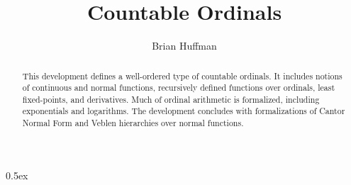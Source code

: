 \documentclass[11pt,a4paper]{article}
\begin{document}
\title{Countable Ordinals}
\author{Brian Huffman}
\maketitle
\begin{abstract}
This development defines a well-ordered type of countable ordinals.
It includes notions of continuous and normal functions, recursively
defined functions over ordinals, least fixed-points, and derivatives.
Much of ordinal arithmetic is formalized, including exponentials and
logarithms. The development concludes with formalizations of Cantor
Normal Form and Veblen hierarchies over normal functions.
\end{abstract}

\tableofcontents


\newpage

\parindent 0pt\parskip 0.5ex



%
%
\end{document}
